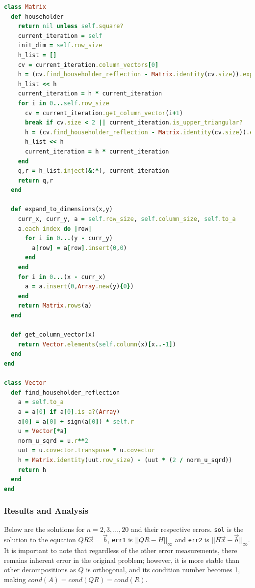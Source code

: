 \documentclass[letterpaper,12pt]{article}
\begin{document}
\lstset{caption=QR Decomposition via Householder Reflections}
\begin{lstlisting}[language=ruby]
class Matrix
  def householder
    return nil unless self.square?
    current_iteration = self
    init_dim = self.row_size
    h_list = []
    cv = current_iteration.column_vectors[0]
    h = (cv.find_householder_reflection - Matrix.identity(cv.size)).expand_to_dimensions(init_dim,init_dim) + Matrix.identity(init_dim)
    h_list << h
    current_iteration = h * current_iteration
    for i in 0...self.row_size
      cv = current_iteration.get_column_vector(i+1)
      break if cv.size < 2 || current_iteration.is_upper_triangular?
      h = (cv.find_householder_reflection - Matrix.identity(cv.size)).expand_to_dimensions(init_dim,init_dim) + Matrix.identity(init_dim)
      h_list << h
      current_iteration = h * current_iteration
    end
    q,r = h_list.inject(&:*), current_iteration
    return q,r
  end

  def expand_to_dimensions(x,y)
    curr_x, curr_y, a = self.row_size, self.column_size, self.to_a
    a.each_index do |row|
      for i in 0...(y - curr_y)
        a[row] = a[row].insert(0,0)
      end
    end
    for i in 0...(x - curr_x)
      a = a.insert(0,Array.new(y){0})
    end
    return Matrix.rows(a)
  end

  def get_column_vector(x)
    return Vector.elements(self.column(x)[x..-1])
  end
end

class Vector
  def find_householder_reflection
    a = self.to_a
    a = a[0] if a[0].is_a?(Array)
    a[0] = a[0] + sign(a[0]) * self.r
    u = Vector[*a]
    norm_u_sqrd = u.r**2
    uut = u.covector.transpose * u.covector
    h = Matrix.identity(uut.row_size) - (uut * (2 / norm_u_sqrd))
    return h
  end
end
\end{lstlisting}

\subsubsection{Results and Analysis}

Below are the solutions for $n = 2,3,...,20$ and their respective errors.
\texttt{sol} is the solution to the equation $QR\vec{x}=\vec{b}$, \texttt{err1}
is $||QR - H||_{\infty}$ and \texttt{err2} is $||H\vec{x} - \vec{b}||_{\infty}$.
It is important to note that regardless of the other error measurements, there
remains inherent error in the original problem; however, it is more stable than
other decompositions as $Q$ is orthogonal, and its condition number becomes 1,
making $cond(A) = cond(QR) = cond(R)$.
\end{document}
